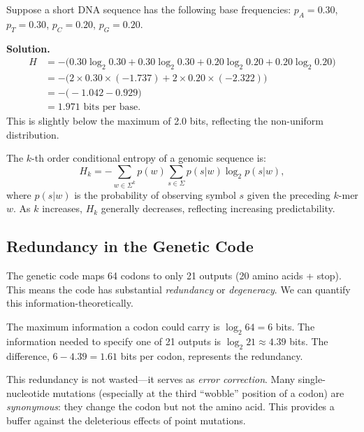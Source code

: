 \begin{example}
Suppose a short DNA sequence has the following base frequencies: $p_A = 0.30$, $p_T = 0.30$, $p_C = 0.20$, $p_G = 0.20$.

\textbf{Solution.}
\begin{align*}
H &= -\bigl(0.30 \log_2 0.30 + 0.30 \log_2 0.30 + 0.20 \log_2 0.20 + 0.20 \log_2 0.20\bigr) \\
  &= -\bigl(2 \times 0.30 \times (-1.737) + 2 \times 0.20 \times (-2.322)\bigr) \\
  &= -\bigl(-1.042 - 0.929\bigr) \\
  &= 1.971 \text{ bits per base.}
\end{align*}
This is slightly below the maximum of 2.0 bits, reflecting the non-uniform distribution.
\end{example}

\begin{dogmadef}
The $k$-th order conditional entropy of a genomic sequence is:
\begin{equation}
H_k = -\sum_{w \in \Sigma^k} p(w) \sum_{s \in \Sigma} p(s | w) \log_2 p(s | w),
\end{equation}
where $p(s | w)$ is the probability of observing symbol $s$ given the preceding $k$-mer $w$. As $k$ increases, $H_k$ generally decreases, reflecting increasing predictability.
\end{dogmadef}

\subsection{Redundancy in the Genetic Code}
\label{subsec:redundancy}

The genetic code maps 64 codons to only 21 outputs (20 amino acids + stop). This means the code has substantial \emph{redundancy} or \emph{degeneracy}. We can quantify this information-theoretically.

The maximum information a codon could carry is $\log_2 64 = 6$ bits. The information needed to specify one of 21 outputs is $\log_2 21 \approx 4.39$ bits. The difference, $6 - 4.39 = 1.61$ bits per codon, represents the redundancy.

This redundancy is not wasted---it serves as \emph{error correction}. Many single-nucleotide mutations (especially at the third ``wobble'' position of a codon) are \emph{synonymous}: they change the codon but not the amino acid. This provides a buffer against the deleterious effects of point mutations.

